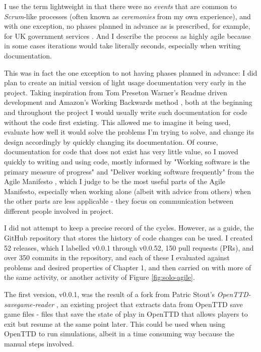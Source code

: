 \documentclass[logo,msc,dsti]{infthesis}    %
\begin{document}
I use the term lightweight in that there were no \emph{events} that are common to \emph{Scrum}-like processes \cite{SCRUM} (often known as \emph{ceremonies} from my own experience), and with one exception, no phases planned in advance as is prescribed, for example, for UK government services \cite{GOVUKAgile}. And I describe the process as highly agile because in some cases iterations would take literally seconds, especially when writing documentation.

This was in fact the one exception to not having phases planned in advance: I did plan to create an initial version of light usage documentation very early in the project. Taking inspiration from Tom Preseton Warner's Readme driven development \cite{ReadmeDrivenDevelopment} and Amazon's Working Backwards method \cite{bryar2021working}, both at the beginning and throughout the project I would usually write such documentation for code without the code first existing. This allowed me to imagine it being used, evaluate how well it would solve the problems I'm trying to solve, and change its design accordingly by quickly changing its documentation. Of course, documentation for code that does not exist has very little value, so I moved quickly to writing and using code, mostly informed by "Working software is the primary measure of progress" and "Deliver working software frequently" from the Agile Manifesto \cite{beck2001manifesto}, which I judge to be the most useful parts of the Agile Manifesto, especially when working alone (albeit with advice from others) when the other parts are less applicable - they focus on communication between different people involved in project.

I did not attempt to keep a precise record of the cycles. However, as a guide, the GitHub repository that stores the history of code changes can be used. I created 52 releases, which I labelled v0.0.1 through v0.0.52, 150 pull requests (PRs), and over 350 commits in the repository, and each of these I evaluated against problems and desired properties of Chapter 1, and then carried on with more of the same activity, or another activity of Figure \ref{fig:solo-agile}.

The first version, v0.0.1, was the result of a fork from Patric Stout's \emph{OpenTTD-savegame-reader} \cite{Stout2024}, an existing project that extracts data from OpenTTD save game files - files that save the state of play in OpenTTD that allows players to exit but resume at the same point later. This could be used when using OpenTTD to run simulations, albeit in a time consuming way because the manual steps involved.
\end{document}
